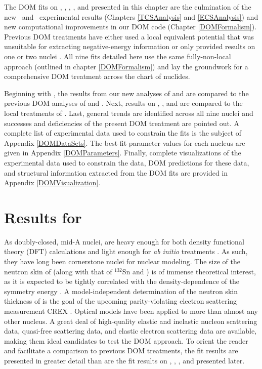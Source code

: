 The \gls{DOM} fits on \oSixEight, \caAughtEight, \niEightFour,
\snTwelveFour, and \pbEight presented in
this chapter are the culmination of the new \tot\ and \el\ experimental results
(Chapters \ref{TCSAnalysis} and \ref{ECSAnalysis})
and new computational improvements in our DOM code (Chapter \ref{DOMFormalism}).
Previous DOM treatments have either used a
local equivalent potential \cite{Charity2006, Mueller2011} that was unsuitable for extracting
negative-energy information or only provided results on one or
two nuclei \cite{Mahzoon2017}. All nine fits detailed here use the same fully-non-local approach
(outlined in chapter \ref{DOMFormalism}) and lay the groundwork for a comprehensive DOM treatment 
across the chart of nuclides.

Beginning with \caForty, the results from our new analyses of
\caAughtEight and \pbEight are compared to the previous DOM analyses of \cite{MahzoonPhDThesis} and 
\cite{Atkinson2018}. Next, results on \oSixEight, \niEightFour, and \snTwelveFour are compared to
the local treatments of \cite{Charity2006, Mueller2011}. Last, general trends are identified across
all nine nuclei and successes and deficiencies of the present DOM treatment are pointed out.
A complete list of experimental data used to constrain the fits is the subject of Appendix
\ref{DOMDataSets}. The best-fit parameter values for each nucleus are given in Appendix
\ref{DOMParameters}. Finally, complete visualizations of the experimental data used to constrain
the data, DOM predictions for these data, and structural information extracted from the DOM fits are
provided in Appendix \ref{DOMVisualization}.

\section{Results for \caAughtEight}
As doubly-closed, mid-A nuclei, \caAughtEight are heavy enough for both density functional
theory (DFT) calculations \cite{Piekarewicz2012} and light enough for \textit{ab initio} 
treatments \cite{Hagen2016}. As such, they have long been cornerstone nuclei for
nuclear modeling. The size of the neutron skin of \caEight (along with that of $^{132}$Sn and
\pbEight) is of immense theoretical interest, as it is expected to be tightly correlated with the
density-dependence of the symmetry energy \cite{Fattoyev2012}. A model-independent determination
of the neutron skin thickness of \caEight is the goal of the upcoming parity-violating
electron scattering measurement CREX \cite{CREX}. Optical models have been applied to
\caAughtEight more than almost any other nucleus. A great deal of high-quality \caAughtEight elastic 
and inelastic nucleon scattering data, quasi-free scattering data, and elastic electron
scattering data are available, making them ideal candidates to test the DOM approach. To orient the
reader and facilitate a comparison to previous DOM treatments, the \caAughtEight fit results are
presented in greater detail than are the fit results on \oSixEight, \niEightFour,
\snTwelveFour, and \pbEight presented later.

